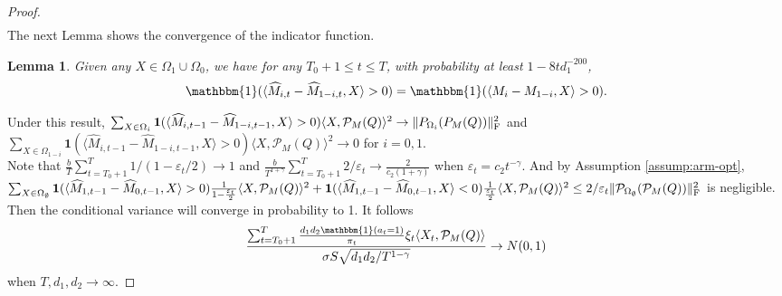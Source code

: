 \documentclass[12pt]{article}
\newcommand\fro[1]{\| #1 \|_{\rm{F}}}
\newcommand{\inp}[2]{\langle #1,#2\rangle}
\def\calP{{\mathcal P}}
\def\indicator{\mathbf{1}}
\newtheorem{Lemma}{Lemma}
\theoremstyle{plain}
\begin{document}
\begin{proof}
\begin{align*}
    \end{align*}
    The next Lemma shows the convergence of the indicator function.
    \begin{Lemma} 
        \label{indicator}
        Given any $X\in \Omega_1\cup\Omega_0$, we have for any $T_0+1\leq t\leq T$, with probability at least $1-8td_1^{-200}$,
        \begin{align*}
            \mathbbm{1}(\inp{\widehat{M}_{i,t}-\widehat{M}_{1-i,t}}{X}> 0)= \mathbbm{1}(\inp{M_i-M_{1-i}}{X}> 0).
        \end{align*}
    \end{Lemma}
    Under this result, $\sum_{X\in \Omega_i} \indicator(\inp{\widehat{M}_{i,t-1}-\widehat{M}_{1-i,t-1}}{X}>0)\inp{X}{\mathcal{P}_M(Q)}^2\rightarrow \fro{P_{\Omega_i}(P_{M}(Q))}^2$ and $\sum_{X\in \Omega_{1-i}} \indicator(\inp{\widehat{M}_{i,t-1}-\widehat{M}_{1-i,t-1}}{X}>0)\inp{X}{\mathcal{P}_M(Q)}^2\rightarrow 0$ for $i=0,1$. \\
    Note that $\frac{b}{T}\sum_{t=T_0+1}^{T} 1/(1-\varepsilon_t/2)\rightarrow 1$ and $\frac{b}{T^{1+\gamma}}\sum_{t=T_0+1}^{T} 2/\varepsilon_t\rightarrow \frac{2}{c_2(1+\gamma)}$ when $\varepsilon_t=c_2t^{-\gamma}$. And by Assumption \ref{assump:arm-opt}, $\sum_{X\in \Omega_\emptyset} \indicator(\inp{\widehat{M}_{1,t-1}-\widehat{M}_{0,t-1}}{X}>0)\frac{1}{1-\frac{\varepsilon_t}{2}}\inp{X}{\mathcal{P}_M(Q)}^2  +  \indicator(\inp{\widehat{M}_{1,t-1}-\widehat{M}_{0,t-1}}{X}<0)\frac{1}{\frac{\varepsilon_t}{2}}\inp{X}{\mathcal{P}_M(Q)}^2\leq 2/\varepsilon_t \fro{\calP_{\Omega_{\emptyset}}(\calP_{M}(Q))}^2$ is negligible. Then the conditional variance will converge in probability to 1. It follows
    \begin{align*}
        \frac{\sum_{t=T_0+1}^T \frac{d_1d_2\mathbbm{1}(a_t=1)}{\pi_t}\xi_t\inp{X_t}{\mathcal{P}_M(Q)}}{\sigma S\sqrt{d_1d_2/T^{1-\gamma}}} \rightarrow N(0,1)
    \end{align*}
    when $T, d_1, d_2\rightarrow \infty$.
\end{proof}
\end{document}
